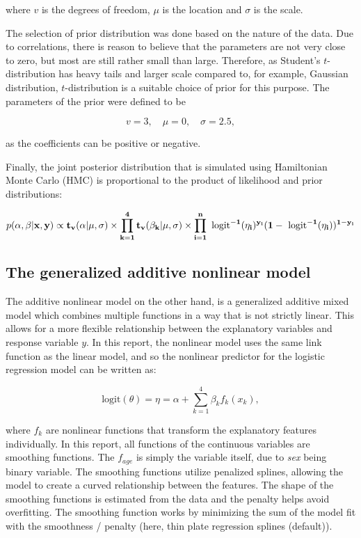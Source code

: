 \documentclass[
  letterpaper,
  DIV=11,
  numbers=noendperiod]{scrartcl}
\begin{document}
where \(v\) is the degrees of freedom, \(\mu\) is the location and
\(\sigma\) is the scale.

The selection of prior distribution was done based on the nature of the
data. Due to correlations, there is reason to believe that the
parameters are not very close to zero, but most are still rather small
than large. Therefore, as Student's \(t\)-distribution has heavy tails
and larger scale compared to, for example, Gaussian distribution,
\(t\)-distribution is a suitable choice of prior for this purpose. The
parameters of the prior were defined to be

\[
v = 3, \quad \mu = 0, \quad \sigma = 2.5,
\]

as the coefficients can be positive or negative.

Finally, the joint posterior distribution that is simulated using
Hamiltonian Monte Carlo (HMC) is proportional to the product of
likelihood and prior distributions:

\[
p(\alpha, \beta | \bf{x}, \bf{y} ) \propto t_v(\alpha | \mu, \sigma) \times \prod^4_{k=1} t_v(\beta_k | \mu, \sigma) \times \prod^n_{i=1} \text{ logit}^{-1}(\eta_i)^{y_i}(1-\text{ logit}^{-1}(\eta_i))^{1-y_i}
\]

\hypertarget{the-generalized-additive-nonlinear-model}{%
\subsection{The generalized additive nonlinear
model}\label{the-generalized-additive-nonlinear-model}}

The additive nonlinear model on the other hand, is a generalized
additive mixed model which combines multiple functions in a way that is
not strictly linear. This allows for a more flexible relationship
between the explanatory variables and response variable \(y\). In this
report, the nonlinear model uses the same link function as the linear
model, and so the nonlinear predictor for the logistic regression model
can be written as:

\[
\text{logit} (\theta) = \eta = \alpha + \sum^4_{k=1} \beta_k f_k(x_k),
\]

where \(f_k\) are nonlinear functions that transform the explanatory
features individually. In this report, all functions of the continuous
variables are smoothing functions. The \(f_{age}\) is simply the
variable itself, due to \emph{sex} being binary variable. The smoothing
functions utilize penalized splines, allowing the model to create a
curved relationship between the features. The shape of the smoothing
functions is estimated from the data and the penalty helps avoid
overfitting. The smoothing function works by minimizing the sum of the
model fit with the smoothness / penalty (here, thin plate regression
splines (default)).
\end{document}
